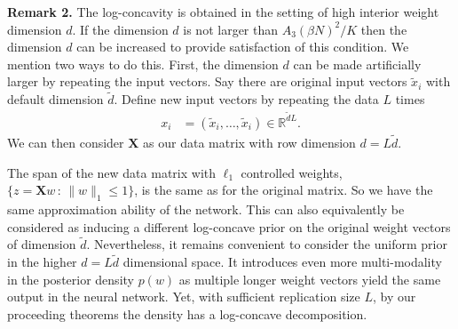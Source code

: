 \documentclass{article}
\numberwithin{equation}{section}
\theoremstyle{Lemma}
\theoremstyle{Corollary}
\theoremstyle{Theorem}
\theoremstyle{Remark}
\newtheorem{remark}{Remark}
\begin{document}

\noindent \textbf{Remark 2.}
The log-concavity is obtained in the setting of high interior weight dimension $d$. If the dimension $d$ is not larger than $A_3 (\beta N)^2/K$ then the dimension $d$ can be increased to provide satisfaction of this condition.  We mention two ways to do this. First, the dimension $d$ can be made artificially larger by repeating the input vectors. Say there are original input vectors $\tilde x_{i}$ with default dimension $\tilde{d}$. Define new input vectors by repeating the data $L$ times
\begin{align}
    {x}_{i} &= (\tilde {x}_{i}, \ldots, \tilde{x}_{i}) \in \mathbb{R}^{\tilde{d}L}.
\end{align}
We can then consider ${\textbf{X}}$ as our data matrix with row dimension $d=L \tilde{d}$.

The span of the new data matrix with $\ell_{1}$ controlled weights, $\{z = \textbf{X}w\,:\,\|w\|_{1} \leq 1\}$, is the same as for the original matrix. So we have the same approximation ability of the network. This can also equivalently be considered as inducing a different log-concave prior on the original weight vectors of dimension $\tilde{d}$. Nevertheless, it remains convenient to consider the uniform prior in the higher $d = L\tilde{d}$ dimensional space.  It introduces even more multi-modality in the posterior density $p(w)$ as multiple longer weight vectors yield the same output in the neural network. Yet, with sufficient replication size $L$, by our proceeding theorems the density has a log-concave decomposition. 
\end{document}
